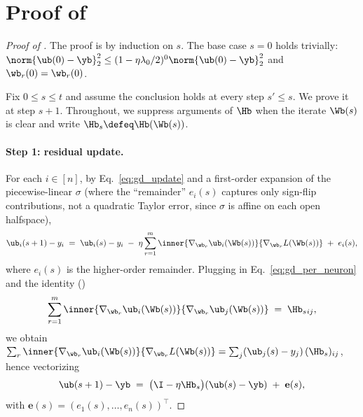 \section{Proof of \texorpdfstring{}{Lemma 3}}\label{sec:proof_linear_conv}

\begin{proof}[Proof of ]
The proof is by induction on $s$. The base case $s = 0$ holds trivially: $\norm{\ub(0) - \yb}_2^2 \le (1 - \eta \lambda_0/2)^0 \norm{\ub(0) - \yb}_2^2$ and $\wb_r(0) = \wb_r(0)$.

Fix $0 \le s \le t$ and assume the conclusion holds at every step $s' \le s$. We prove it at step $s + 1$. Throughout, we suppress arguments of $\Hb$ when the iterate $\Wb(s)$ is clear and write $\Hb_s \defeq \Hb(\Wb(s))$.

\paragraph{Step 1: residual update.}
For each $i \in [n]$, by Eq.~\eqref{eq:gd_update} and a first-order expansion of the piecewise-linear $\sigma$ (where the ``remainder'' $e_i(s)$ captures only sign-flip contributions, not a quadratic Taylor error, since $\sigma$ is affine on each open halfspace),
\begin{align}\label{eq:residual_update}
\ub_i(s+1) - y_i
\;=\; \ub_i(s) - y_i \;-\; \eta \sum_{r = 1}^m \inner{\nabla_{\wb_r} \ub_i(\Wb(s))}{\nabla_{\wb_r} L(\Wb(s))} \;+\; e_i(s),
\end{align}
where $e_i(s)$ is the higher-order remainder. Plugging in Eq.~\eqref{eq:gd_per_neuron} and the identity ()
\begin{align}\label{eq:gram_inner_product}
\sum_{r=1}^m \inner{\nabla_{\wb_r} \ub_i(\Wb(s))}{\nabla_{\wb_r} \ub_j(\Wb(s))} \;=\; \Hb_s {}_{ij},
\end{align}
we obtain $\sum_r \inner{\nabla_{\wb_r} \ub_i(\Wb(s))}{\nabla_{\wb_r} L(\Wb(s))} = \sum_j (\ub_j(s) - y_j) \, (\Hb_s)_{ij}$, hence vectorizing
\begin{align}\label{eq:residual_vector_update}
\ub(s+1) - \yb \;=\; \big( \I - \eta \Hb_s \big) (\ub(s) - \yb) \;+\; \mathbf e(s),
\end{align}
with $\mathbf e(s) = (e_1(s), \ldots, e_n(s))^\top$.


\end{proof}
